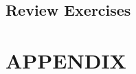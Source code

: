 \documentclass[a4paper, 10 pt, conference]{ieeeconf}
\begin{document}
\subsection{\textbf{Review Exercises}}

\section*{APPENDIX}



\end{document}
